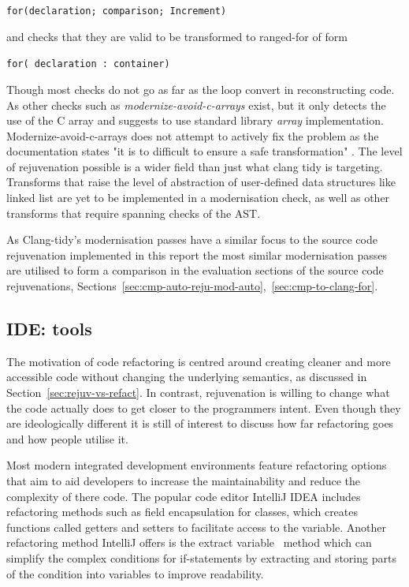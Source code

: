 \documentclass[bsc,frontabs,singlespacing,twoside,parskip,deptreport]{infthesis}
\begin{document}
\begin{center}
\texttt{for(declaration; comparison; Increment)}    
\end{center}

and checks that they are valid to be transformed to ranged-for of form

\begin{center}
\texttt{for( declaration : container)} 
\end{center}

Though most checks do not go as far as the loop convert in reconstructing code. As other checks such as \textit{modernize-avoid-c-arrays} \cite{ARRAY_CONVERT} exist, but it only detects the use of the C array and suggests to use standard library \textit{array} implementation. Modernize-avoid-c-arrays does not attempt to actively fix the problem as the documentation states "it is to difficult to ensure a safe transformation" \cite{ARRAY_CONVERT}. The level of rejuvenation possible is a wider field than just what clang tidy is targeting. Transforms that raise the level of abstraction of user-defined data structures like linked list are yet to be implemented in a modernisation check, as well as other transforms that require spanning checks of the AST.

As Clang-tidy's modernisation passes have a similar focus to the source code rejuvenation implemented in this report the most similar modernisation passes are utilised to form a comparison in the evaluation sections of the source code rejuvenations, Sections~\ref{sec:cmp-auto-reju-mod-auto},~\ref{sec:cmp-to-clang-for}.   

\subsection{IDE: tools}
The motivation of code refactoring is centred around creating cleaner and more accessible code without changing the underlying semantics, as discussed in Section~\ref{sec:rejuv-vs-refact}. In contrast, rejuvenation is willing to change what the code actually does to get closer to the programmers intent. Even though they are ideologically different it is still of interest to discuss how far refactoring goes and how people utilise it.

Most modern integrated development environments feature refactoring options that aim to aid developers to increase the maintainability and reduce the complexity of there code. The popular code editor IntelliJ IDEA \cite{IDEA} includes refactoring methods such as field encapsulation \cite{IDEA_ENCAP} for classes, which creates functions called getters and setters to facilitate access to the variable. Another refactoring method IntelliJ offers is the extract variable~\cite{IDEA_EXTRACT} method which can simplify the complex conditions for if-statements by extracting and storing parts of the condition into variables to improve readability.
\end{document}
